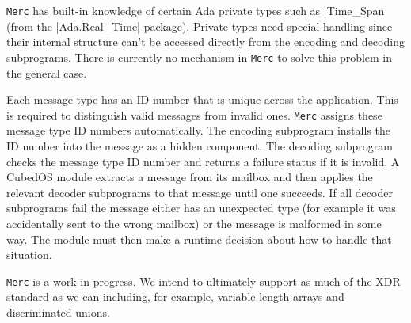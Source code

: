 \texttt{Merc} has built-in knowledge of certain Ada private types such as |Time_Span| (from the
|Ada.Real_Time| package). Private types need special handling since their internal structure
can't be accessed directly from the encoding and decoding subprograms. There is currently no
mechanism in \texttt{Merc} to solve this problem in the general case.

Each message type has an ID number that is unique across the application. This is required to
distinguish valid messages from invalid ones. \texttt{Merc} assigns these message type ID
numbers automatically. The encoding subprogram installs the ID number into the message as a
hidden component. The decoding subprogram checks the message type ID number and returns a
failure status if it is invalid. A CubedOS module extracts a message from its mailbox and then
applies the relevant decoder subprograms to that message until one succeeds. If all decoder
subprograms fail the message either has an unexpected type (for example it was accidentally sent
to the wrong mailbox) or the message is malformed in some way. The module must then make a
runtime decision about how to handle that situation.

\texttt{Merc} is a work in progress. We intend to ultimately support as much of the XDR standard
as we can including, for example, variable length arrays and discriminated unions.
